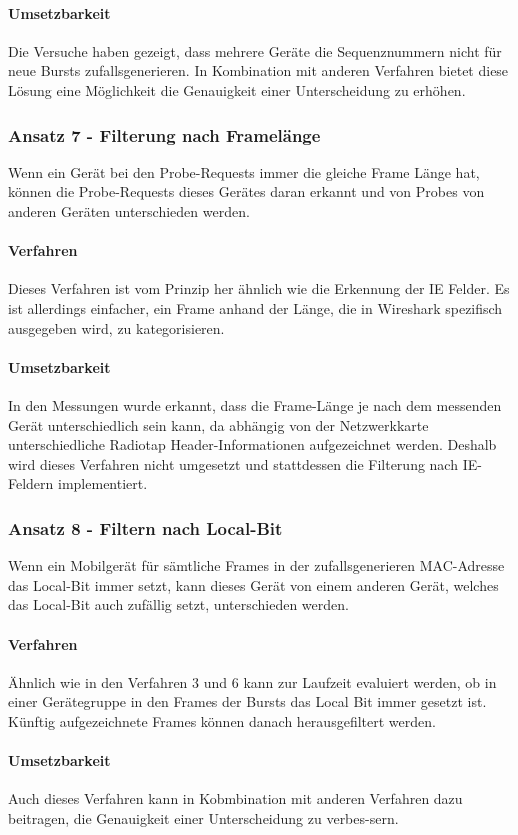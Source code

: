 \paragraph{Umsetzbarkeit}
Die Versuche haben gezeigt, dass mehrere Geräte die Sequenznummern nicht 
für neue Bursts zufallsgenerieren.
In Kombination mit anderen Verfahren bietet diese Lösung eine 
Möglichkeit die Genauigkeit einer Unterscheidung zu erhöhen.

\subsubsection*{Ansatz 7 - Filterung nach Framelänge}
Wenn ein Gerät bei den Probe-Requests immer die gleiche Frame Länge hat, 
können die Probe-Requests dieses Gerätes daran erkannt und von Probes von 
anderen Geräten unterschieden werden.

\paragraph{Verfahren}
Dieses Verfahren ist vom Prinzip her ähnlich wie die Erkennung der IE Felder. 
Es ist allerdings einfacher, ein Frame anhand der Länge, 
die in Wireshark spezifisch ausgegeben wird, zu kategorisieren.

\paragraph{Umsetzbarkeit}
In den Messungen wurde erkannt, dass die Frame-Länge je nach dem messenden 
Gerät unterschiedlich sein kann, 
da abhängig von der Netzwerkkarte unterschiedliche Radiotap Header-Informationen 
aufgezeichnet werden. 
Deshalb wird dieses Verfahren nicht umgesetzt und stattdessen die Filterung nach 
IE-Feldern implementiert.

\subsubsection*{Ansatz 8 - Filtern nach Local-Bit}
Wenn ein Mobilgerät für sämtliche Frames in der zufallsgenerieren MAC-Adresse
das Local-Bit immer setzt, kann dieses Gerät von einem anderen Gerät, 
welches das Local-Bit auch zufällig setzt, unterschieden werden.

\paragraph{Verfahren}
Ähnlich wie in den Verfahren 3 und 6 kann zur Laufzeit evaluiert werden,
ob in einer Gerätegruppe in den Frames der Bursts das Local Bit immer 
gesetzt ist. Künftig aufgezeichnete Frames können danach herausgefiltert werden.

\paragraph{Umsetzbarkeit}
Auch dieses Verfahren kann in Kobmbination mit anderen Verfahren dazu beitragen,
die Genauigkeit einer Unterscheidung zu verbes-sern.

\clearpage